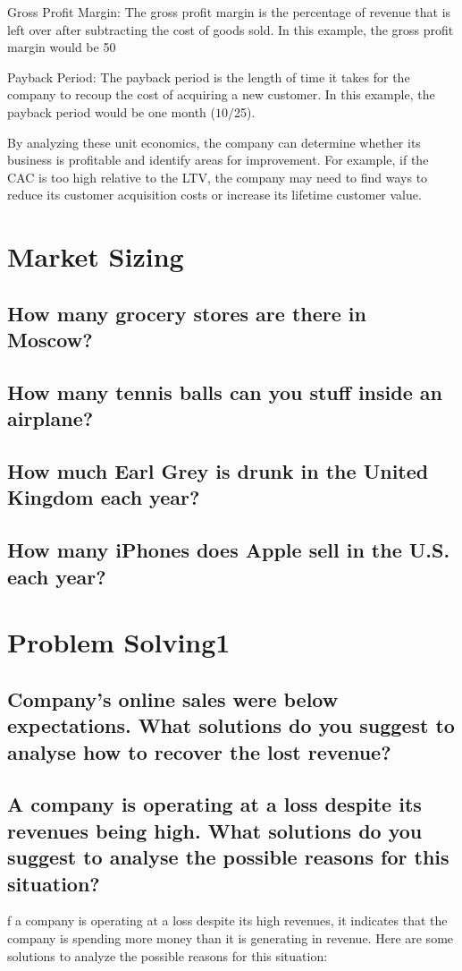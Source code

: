\documentclass[12pt, a4paper, oneside]{article}
\begin{document}
Gross Profit Margin: The gross profit margin is the percentage of revenue that is left over after subtracting the cost of goods sold. In this example, the gross profit margin would be 50%

Payback Period: The payback period is the length of time it takes for the company to recoup the cost of acquiring a new customer. In this example, the payback period would be one month ($10 / $25).

By analyzing these unit economics, the company can determine whether its business is profitable and identify areas for improvement. For example, if the CAC is too high relative to the LTV, the company may need to find ways to reduce its customer acquisition costs or increase its lifetime customer value.
 
\section{Market Sizing}
\subsection{ How many grocery stores are there in Moscow? }

\subsection{ How many tennis balls can you stuff inside an airplane? }

\subsection{ How much Earl Grey is drunk in the United Kingdom each year? }
\subsection{ How many iPhones does Apple sell in the U.S. each year?   }
\section{Problem Solving1}
\subsection{ Company’s online sales were below expectations. What solutions do you suggest to analyse how to recover the lost revenue?  }


\subsection{ A company is operating at a loss despite its revenues being high. What solutions do you suggest to analyse the possible reasons for this situation? }
f a company is operating at a loss despite its high revenues, it indicates that the company is spending more money than it is generating in revenue. Here are some solutions to analyze the possible reasons for this situation:
\end{document}
